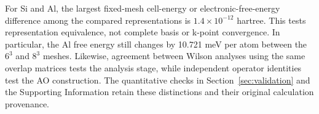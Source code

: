 For Si and Al, the largest fixed-mesh cell-energy or electronic-free-energy
difference among the compared representations is
$1.4\times10^{-12}$ hartree. This tests representation equivalence,
not complete basis or k-point convergence. In particular, the Al
free energy still changes by 10.721 meV per atom between the
$6^3$ and $8^3$ meshes. Likewise, agreement between Wilson analyses
using the same overlap matrices tests the analysis stage, while
independent operator identities test the AO construction.
The quantitative checks in Section~\ref{sec:validation} and the
Supporting Information retain these distinctions and their original
calculation provenance.
